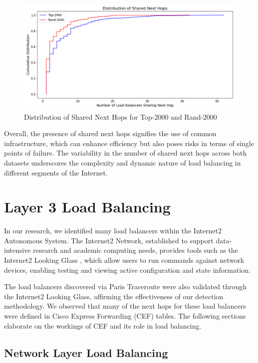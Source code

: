 \documentclass[12pt]{cwru_thesis}
\begin{document}
\begin{figure}[h!]
    \centering
    \includegraphics[width=\linewidth]{figures/shared_next_hops_combined.png}
    \caption{Distribution of Shared Next Hops for Top-2000 and Rand-2000}
    \label{fig:shared_next_hops_combined}
\end{figure}

Overall, the presence of shared next hops signifies the use of common infrastructure, which can enhance efficiency but also poses risks in terms of single points of failure. The variability in the number of shared next hops across both datasets underscores the complexity and dynamic nature of load balancing in different segments of the Internet.


\chapter{Layer 3 Load Balancing}

In our research, we identified many load balancers within the Internet2 Autonomous System. The Internet2 Network, established to support data-intensive research and academic computing needs, provides tools such as the Internet2 Looking Glass \cite{internet2_looking_glass}, which allow users to run commands against network devices, enabling testing and viewing active configuration and state information.

The load balancers discovered via Paris Traceroute were also validated through the Internet2 Looking Glass, affirming the effectiveness of our detection methodology. We observed that many of the next hops for these load balancers were defined in Cisco Express Forwarding (CEF) tables. The following sections elaborate on the workings of CEF and its role in load balancing.

\section{Network Layer Load Balancing}
\end{document}
